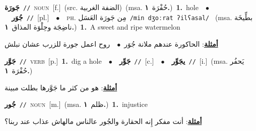 \documentclass[10pt,a4paper,twoside]{article} %
\begin{document}
\begin{multicols}{2}
{\setlength\topsep{0pt}\textbf{\foreignlanguage{arabic}{جَورَة}}\ {\color{gray}\texttt{//}\color{black}}\ \textsc{noun}\ [f.]\ (src. \color{gray}\foreignlanguage{arabic}{الضفة الغربية}\color{black})\ \color{gray}(msa. \foreignlanguage{arabic}{حُفْرَة}~\foreignlanguage{arabic}{\textbf{١.}})\color{black}\ \textbf{1.}~hole\ \ $\bullet$\ \ \setlength\topsep{0pt}\textbf{\foreignlanguage{arabic}{جُوَر}}\ {\color{gray}\texttt{//}\color{black}}\ [pl.]\ \ $\bullet$\ \ \textsc{ph.} \color{gray} \foreignlanguage{arabic}{مِن جَورَة العَسَل}\color{black}\ {\color{gray}\texttt{/{\sffamily min dʒoːrat ʔilʕasal}/}\color{black}}\ \color{gray} (msa. \foreignlanguage{arabic}{بطِّيخَة ناضِجَة وحِلْوَة المذاق}~\foreignlanguage{arabic}{\textbf{١.}})\color{black}\ \textbf{1.}~A sweet and ripe watermelon\  \begin{flushright}\color{gray}\foreignlanguage{arabic}{\textbf{\underline{\foreignlanguage{arabic}{أمثلة}}}: الحاكورة عندهم ملانة جُوَر\ $\bullet$\ \  روح اعمل جورة للزرب عشان نبلش}\end{flushright}\color{black}} \vspace{2mm}

{\setlength\topsep{0pt}\textbf{\foreignlanguage{arabic}{جَوَّر}}\ {\color{gray}\texttt{//}\color{black}}\ \textsc{verb}\ [p.]\ \textbf{1.}~dig a hole\ \ $\bullet$\ \ \setlength\topsep{0pt}\textbf{\foreignlanguage{arabic}{جَوِّر}}\ {\color{gray}\texttt{//}\color{black}}\ [c.]\ \ $\bullet$\ \ \setlength\topsep{0pt}\textbf{\foreignlanguage{arabic}{يجَوِّر}}\ {\color{gray}\texttt{//}\color{black}}\ [i.]\ \color{gray}(msa. \foreignlanguage{arabic}{يَحفُر حُفْرَة}~\foreignlanguage{arabic}{\textbf{١.}})\color{black}\  \begin{flushright}\color{gray}\foreignlanguage{arabic}{\textbf{\underline{\foreignlanguage{arabic}{أمثلة}}}: هو من كثر ما جَوَّرها بطلت مبينة}\end{flushright}\color{black}} \vspace{2mm}

{\setlength\topsep{0pt}\textbf{\foreignlanguage{arabic}{جُور}}\ {\color{gray}\texttt{//}\color{black}}\ \textsc{noun}\ [m.]\ \color{gray}(msa. \foreignlanguage{arabic}{ظلم}~\foreignlanguage{arabic}{\textbf{١.}})\color{black}\ \textbf{1.}~injustice\  \begin{flushright}\color{gray}\foreignlanguage{arabic}{\textbf{\underline{\foreignlanguage{arabic}{أمثلة}}}: أنت مفكر إِنه الحقارة والجُور عالناس مالهاش عذاب عند ربنا؟}\end{flushright}\color{black}} \vspace{2mm}


\end{multicols}
\end{document}
